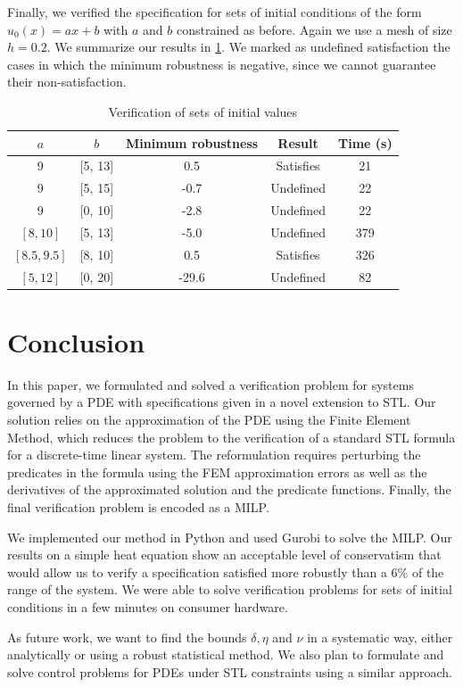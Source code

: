 \documentclass[oribibl]{llncs/llncs}
\begin{document}
Finally, we verified the specification for sets of initial conditions of the
form $u_0(x) = a x + b$ with $a$ and $b$ constrained as before. Again we use a
mesh of size $h = 0.2$. We summarize our results in \cref{tab:res_sets}. We
marked as undefined satisfaction the cases in which the minimum robustness is
negative, since we cannot guarantee their non-satisfaction.

\begin{table}
\centering
\begin{tabular}{|c|c|c|c|c|}
    \hline
    $a$ & $b$ & Minimum robustness & Result & Time (s)  \\
    \hline
    9 & [5, 13] & 0.5 & Satisfies & 21 \\
    9 & [5, 15] & -0.7 & Undefined & 22 \\
    9 & [0, 10] & -2.8 & Undefined & 22 \\
    $[8, 10]$ & [5, 13] & -5.0 & Undefined & 379 \\
    $[8.5, 9.5]$ & [8, 10] & 0.5 & Satisfies & 326 \\
    $[5, 12]$ & [0, 20] & -29.6 & Undefined & 82 \\
    \hline
\end{tabular}
\caption{Verification of sets of initial values}
\label{tab:res_sets}
\end{table}

\section{Conclusion}
\label{sec:conclusion}

In this paper, we formulated and solved a verification problem for systems governed by a
PDE with specifications given in a novel extension to STL. Our solution relies
on the approximation of the PDE using the Finite Element Method, which reduces
the problem to the verification of a standard STL formula for a discrete-time
linear system. The reformulation requires perturbing the predicates in the
formula using the FEM approximation errors as well as the derivatives of the
approximated solution and the predicate functions. Finally, the final
verification problem is encoded as a MILP.

We implemented our method in Python and used Gurobi to solve the MILP. Our
results on a simple heat equation show an acceptable level of conservatism that
would allow us to verify a specification satisfied more robustly than a 6\% of the range of
the system. We were able to solve verification problems for sets of initial conditions in a
few minutes on consumer hardware.

As future work, we want to find the bounds $\delta, \eta$ and $\nu$ in a
systematic way, either analytically or using a robust statistical method. We
also plan to formulate and solve control problems for PDEs under STL constraints
using a similar approach.



\end{document}
